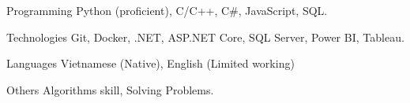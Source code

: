 
\begin{cvskills}

  \cvskill
    {Programming} %
    {Python (proficient), C/C++, C\#, JavaScript, SQL.} %
    
  \cvskill
    {Technologies} %
    {Git, Docker, .NET, ASP.NET Core, SQL Server, Power BI, Tableau.} %

  \cvskill
    {Languages} %
    {Vietnamese (Native), English (Limited working)} %

  \cvskill
    {Others} %
    {Algorithms skill, Solving Problems.} %
\end{cvskills}

